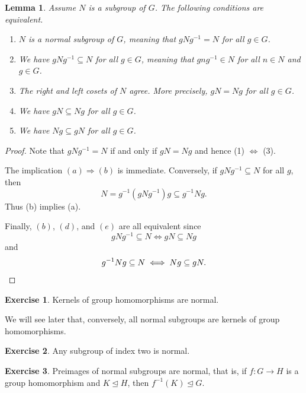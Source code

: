 \documentclass[12pt]{report}
\newtheorem{lemma}[theorem]{Lemma}
\numberwithin{equation}{section}
\numberwithin{theorem}{chapter}
\theoremstyle{definition}
\newtheorem{exercise}{Exercise}
\newtheorem*{basic properties}{Basic Properties}
\newtheorem*{Important Remark}{Important Remark}
\def\norm{\mathrel{\unlhd}}
\begin{document}
\newpage


\begin{lemma}\label{lem925}\label{normal subgroup equivs}
Assume $N$ is a subgroup of $G$. The following conditions are equivalent. 
\begin{enumerate}[label=(\alph*),leftmargin=20pt,itemsep=0.1em]
\item $N$ is a normal subgroup of $G$, meaning that $gNg^{-1} = N$ for all $g \in G$.
\item We have $gNg^{-1} \subseteq N$ for all $g \in G$, meaning that $gng^{-1} \in N$ for all $n \in N$ and $g \in G$.
\item The right and left cosets of $N$ agree. More precisely, $gN = Ng$ for all $g \in G$. 
\item We have $gN \subseteq Ng$ for all $g \in G$.
\item We have $Ng \subseteq gN$ for all $g \in G$.
\end{enumerate}
\end{lemma}



\begin{proof} 
Note that $gNg^{-1} = N$ if and only if $gN = Ng$ and hence (1) $\iff$ (3).
  
The implication $(a) \Rightarrow (b)$ is immediate. Conversely, if $gNg^{-1} \subseteq N$ for all $g$, then 
$$N = g^{-1}(gNg^{-1})g \subseteq g^{-1}Ng.$$ 
Thus (b) implies (a).

Finally, $(b)$, $(d)$, and $(e)$ are all equivalent since 
$$gNg^{-1} \subseteq N \iff gN \subseteq Ng$$
and
$$g^{-1}Ng \subseteq N \iff Ng \subseteq gN.\qedhere$$
\end{proof}

\begin{exercise}\label{kernel is a normal subgroup}
Kernels of group homomorphisms are normal.
\end{exercise}

We will see later that, conversely, all normal subgroups are kernels of group homomorphisms.

\begin{exercise}\label{index 2 normal}
	Any subgroup of index two is normal.
\end{exercise}


\begin{exercise}\label{preimage of normal subgroup is normal}
Preimages of normal subgroups are normal, that is, if $f:G\to H$ is a group homomorphism and $K\norm H$, then $f^{-1}(K)\norm G$.	
\end{exercise}
\end{document}
